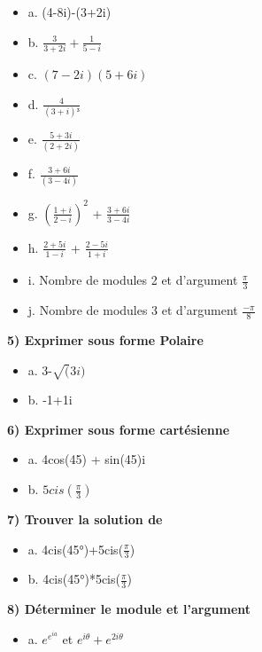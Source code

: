 \begin{itemize}
\item {a. (4-8i)-(3+2i)}
\item {b. $\frac{3}{3+2i} + \frac{1}{5-i}$}
\item {c. $(7-2i)(5+6i)$}
\item {d. $\frac{4}{(3+i)³}$}
\item {e. $\frac{5+3i}{(2+2i)} $}
\item {f. $\frac{3+6i}{(3-4i)} $}
\item {g. $(\frac{1+i}{2-i})^{2}$ + $\frac{3+6i}{3-4i}$}
\item {h. $\frac{2+5i}{1-i}$ + $\frac{2-5i}{1+i}$}
\item {i. Nombre de modules 2 et d'argument $\frac{\pi}{3}$}
\item {j. Nombre de modules 3 et d'argument $\frac{-\pi}{8}$}
\end{itemize}

\vspace{3mm} %
\textbf{5) Exprimer sous forme Polaire}

\begin{itemize}
\item {a. 3-$\sqrt(3i)$}
\item {b. -1+1i}
\end{itemize}

\vspace{3mm} %
\textbf{6) Exprimer sous forme cartésienne}

\begin{itemize}
\item {a. 4cos(45) + sin(45)i}
\item {b. $5cis(\frac{\pi}{3})$}
\end{itemize}

\vspace{3mm} %
\textbf{7) Trouver la solution de}

\begin{itemize}
\item {a. 4cis(45°)+5cis($\frac{\pi}{3}$)}
\item {b. 4cis(45°)*5cis($\frac{\pi}{3}$)}
\end{itemize}

\vspace{3mm} %
\textbf{8) Déterminer le module et l'argument}

\begin{itemize}
\item {a. $e^{e^{ia}}$  et $e^{i\theta} + e^{ 2 i \theta} $}
\end{itemize}

